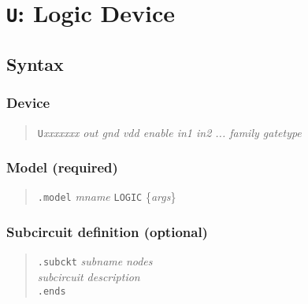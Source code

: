 %
%
%
%
\section{{\tt U}: Logic Device}
\subsection{Syntax}
\subsubsection{Device}
\begin{verse}
{\tt U}{\it xxxxxxx} {\it out gnd vdd enable in1 in2 ... family gatetype}
\end{verse}
\subsubsection{Model (required)}
\begin{verse}
{\tt .model} {\it mname} {\tt LOGIC} \{{\it args}\}
\end{verse}
\subsubsection{Subcircuit definition (optional)}
\begin{verse}
{\tt .subckt} {\it subname} {\it nodes}\\
{\it subcircuit description}\\
{\tt .ends}
\end{verse}

